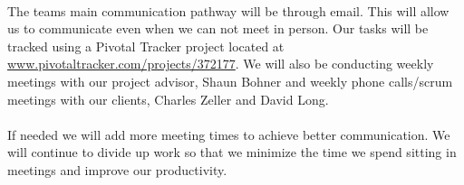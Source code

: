 \paragraph{} The teams main communication pathway will be through email. This will allow us to communicate even when we can not meet in person. Our tasks will be tracked using a Pivotal Tracker project located at \href{https://www.pivotaltracker.com/projects/372177}{www.pivotaltracker.com/projects/372177}. We will also be conducting weekly meetings with our project advisor, Shaun Bohner and weekly phone calls/scrum meetings with our clients, Charles Zeller and David Long.
\paragraph{} If needed we will add more meeting times to achieve better communication. We will continue to divide up work so that we minimize the time we spend sitting in meetings and improve our productivity.